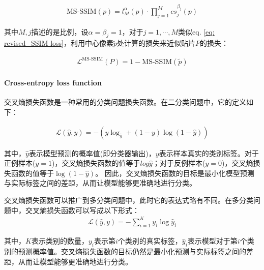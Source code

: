\documentclass[letterpaper,12pt]{article}
\begin{document}
	\begin{equation}
		\begin{aligned}
			\text{MS-SSIM}(p)=l_{M}^\alpha(p)\cdot \prod_{j=1}^M cs_{j}^{\beta_j}(p)
		\end{aligned}
		\label{eq: MS-SSIM}
	\end{equation}
	
	其中$M,j$描述的是比例，设$\alpha=\beta_j=1$，对于$j={1,\cdots, M}$类似eq. \ref{eq: revised_SSIM loss}，利用中心像素$\tilde{p}$处计算的损失来近似贴片$P$的损失：
	
	\begin{equation}
		\begin{aligned}
			\mathcal{L}^{\text{MS-SSIM}}(P)=1-\text{MS-SSIM}(\tilde{p})
		\end{aligned}
		\label{eq: MS-SSIM loss}
	\end{equation}
	
	\paragraph{Cross-entropy loss function}
	
	交叉熵损失函数是一种常用的分类问题损失函数。在二分类问题中，它的定义如下：
	
	\begin{equation}
		\begin{aligned}
			\mathcal{L}(\hat{y},y)=-\left( y\log_{\hat{y}} + (1-y) \log (1-\hat{y}) \right)
		\end{aligned}
		\label{eq: Cross-entropy loss}
	\end{equation}
	
	其中，$\hat{y}$表示模型预测的概率值(即分类器输出)，$y$表示样本真实的类别标签。对于正例样本($y=1$)，交叉熵损失函数的值等于$log {\hat{y}}$；对于反例样本($y=0$)，交叉熵损失函数的值等于$\log (1-\hat{y})$。 因此，交叉熵损失函数的目标是最小化模型预测与实际标签之间的差距，从而让模型能够更准确地进行分类。 
	
	交叉熵损失函数可以推广到多分类问题中，此时它的表达式略有不同。在多分类问题中，交叉熵损失函数可以写成以下形式： 
	\begin{equation}
		\begin{aligned}
			\mathcal{L}(\hat{y},y)=-\sum_{i=1}^K y_i \log \hat{y}_i
		\end{aligned}
		\label{eq: revised_Cross-entropy loss}
	\end{equation} 
	
	其中，$K$表示类别的数量，$y_i$表示第$i$个类别的真实标签，$\hat{y}_i$表示模型对于第$i$个类别的预测概率值。交叉熵损失函数的目标仍然是最小化预测与实际标签之间的差距，从而让模型能够更准确地进行分类。
	
\end{document}
